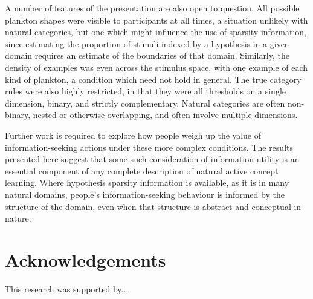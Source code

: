 \documentclass[10pt,letterpaper]{article}
\begin{document}
 A number of features of the presentation are also open to question. All possible plankton shapes were visible to participants at all times, a situation unlikely with natural categories, but one which might influence the use of sparsity information, since estimating the proportion of stimuli indexed by a hypothesis in a given domain requires an estimate of the boundaries of that domain. Similarly, the density of examples was even across the stimulus space, with one example of each kind of plankton, a condition which need not hold in general. The true category rules were also highly restricted, in that they were all thresholds on a single dimension, binary, and strictly complementary. Natural categories are often non-binary, nested or otherwise overlapping, and often involve multiple dimensions. 

Further work is required to explore how people weigh up the value of information-seeking actions under these more complex conditions. The results presented here suggest that some such consideration of information utility is an essential component of any complete description of natural active concept learning. Where hypothesis sparsity information is available, as it is in many natural domains, people's information-seeking behaviour is informed by the structure of the domain, even when that structure is abstract and conceptual in nature.


\section{Acknowledgements}

This research was supported by... 

\renewcommand{\bibliographytypesize}{\footnotesize}


\setlength{\bibleftmargin}{.125in}
\setlength{\bibindent}{-\bibleftmargin}



\end{document}
